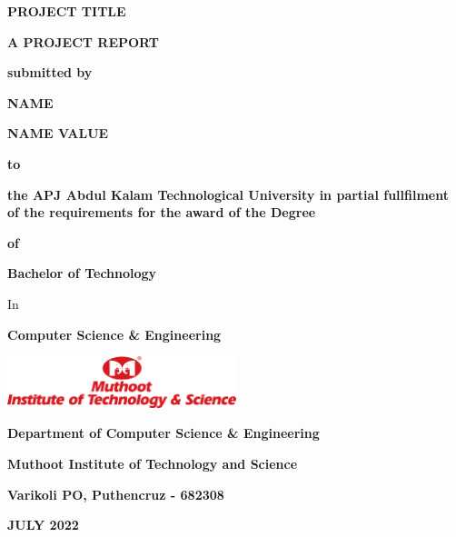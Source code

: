 \documentclass[a4paper,12pt]{report}
\begin{document}
\begin{titlepage}
    \addtolength{\hoffset}{0cm}
    \centering
    {\scshape\large \bfseries PROJECT TITLE \par}
    \vspace{1cm}
    {\scshape \bfseries A PROJECT REPORT \par}
    \vspace{0.5cm}
    {\small \bfseries submitted by \par}
    \vspace{0.5cm}
    {\large \bfseries NAME \par}
    {\large \bfseries NAME VALUE \par}
    \vspace{0.5cm}
    {\small \bfseries to \par}
    \vspace{0.5cm}
    {\small \bfseries  the APJ Abdul Kalam Technological University in partial fullfilment of the requirements for the award of the Degree \par}
    \vspace{0.5cm}
    {\small \bfseries of \par}
    \vspace{0.5cm}
    {\bfseries Bachelor of Technology\par}
    { In \par}
    {\bfseries Computer Science \& Engineering \par}
    \vspace{1cm}
    \includegraphics[width=0.50\textwidth]{images/MITS.png}\par\vspace{1cm}
    {\bfseries Department of Computer Science \& Engineering\par}
    {\bfseries Muthoot Institute of Technology and Science\par}
    {\bfseries Varikoli PO, Puthencruz - 682308 \par}
    \vspace{1cm}
    {\bfseries JULY 2022 \par}
\end{titlepage}
\end{document}

